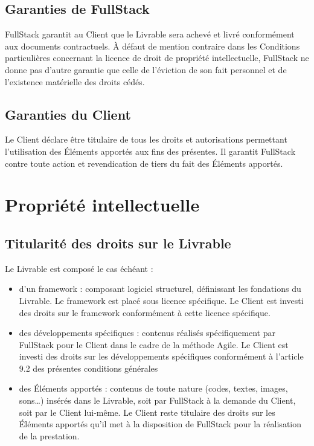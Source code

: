 \documentclass[11pt]{article}
\begin{document}
\subsection{Garanties de FullStack}

FullStack garantit au Client que le Livrable sera achevé et livré conformément aux documents contractuels. À défaut de mention contraire dans les Conditions particulières concernant la licence de droit de propriété intellectuelle, FullStack ne donne pas d’autre garantie que celle de l’éviction de son fait personnel et de l’existence matérielle des droits cédés.

\subsection{Garanties du Client}

Le Client déclare être titulaire de tous les droits et autorisations permettant l’utilisation des Éléments apportés aux fins des présentes. Il garantit FullStack contre toute action et revendication de tiers du fait des Éléments apportés.

\section{Propriété intellectuelle}

\subsection{Titularité des droits sur le Livrable}

Le Livrable est composé le cas échéant :

\begin{itemize}
\item d’un framework : composant logiciel structurel, définissant les fondations du Livrable. Le framework est placé sous licence spécifique. Le Client est investi des droits sur le framework conformément à cette licence spécifique.

\item des développements spécifiques : contenus réalisés spécifiquement par FullStack pour le Client dans le cadre de la méthode Agile. Le Client est investi des droits sur les développements spécifiques conformément à l’article 9.2 des présentes conditions générales

\item des Éléments apportés : contenus de toute nature (codes, textes, images, sons…) insérés dans le Livrable, soit par FullStack à la demande du Client, soit par le Client lui-même. Le Client reste titulaire des droits sur les Éléments apportés qu’il met à la disposition de FullStack pour la réalisation de la prestation.
\end{itemize}
\end{document}
